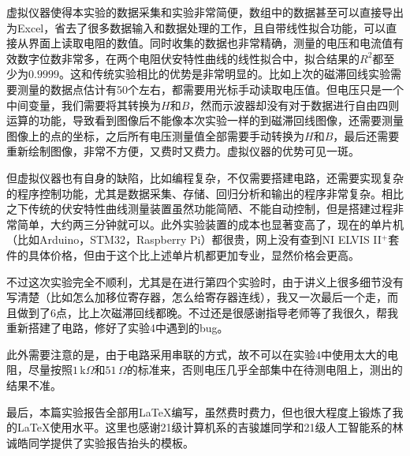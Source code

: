 \documentclass[12pt]{article}
\begin{document}
虚拟仪器使得本实验的数据采集和实验非常简便，数组中的数据甚至可以直接导出为Excel，省去了很多数据输入和数据处理的工作，且自带线性拟合功能，可以直接从界面上读取电阻的数值。同时收集的数据也非常精确，测量的电压和电流值有效数字位数非常多，在两个电阻伏安特性曲线的线性拟合中，拟合结果的$R^2$都至少为$0.9999$。这和传统实验相比的优势是非常明显的。比如上次的磁滞回线实验需要测量的数据点估计有50个左右，都需要用光标手动读取电压值。但电压只是一个中间变量，我们需要将其转换为$H$和$B$，然而示波器却没有对于数据进行自由四则运算的功能，导致看到图像后不能像本次实验一样的到磁滞回线图像，还需要测量图像上的点的坐标，之后所有电压测量值全部需要手动转换为$H$和$B$，最后还需要重新绘制图像，非常不方便，又费时又费力。虚拟仪器的优势可见一斑。

但虚拟仪器也有自身的缺陷，比如编程复杂，不仅需要搭建电路，还需要实现复杂的程序控制功能，尤其是数据采集、存储、回归分析和输出的程序非常复杂。相比之下传统的伏安特性曲线测量装置虽然功能简陋、不能自动控制，但是搭建过程非常简单，大约两三分钟就可以。此外实验装置的成本也显著变高了，现在的单片机（比如Arduino，STM32，Raspberry Pi）都很贵，网上没有查到NI ELVIS II$ ^+ $套件的具体价格，但由于这个比上述单片机都更加专业，显然价格会更高。

不过这次实验完全不顺利，尤其是在进行第四个实验时，由于讲义上很多细节没有写清楚（比如怎么加移位寄存器，怎么给寄存器连线），我又一次最后一个走，而且做到了6点，比上次磁滞回线都晚。不过还是很感谢指导老师等了我很久，帮我重新搭建了电路，修好了实验4中遇到的bug。

此外需要注意的是，由于电路采用串联的方式，故不可以在实验4中使用太大的电阻，尽量按照$1\,\mathrm{k}\Omega$和$51\,\Omega$的标准来，否则电压几乎全部集中在待测电阻上，测出的结果不准。

最后，本篇实验报告全部用\LaTeX{}编写，虽然费时费力，但也很大程度上锻炼了我的\LaTeX{}使用水平。这里也感谢21级计算机系的吉骏雄同学和21级人工智能系的林诚皓同学提供了实验报告抬头的模板。
\end{document}
